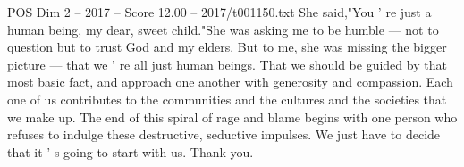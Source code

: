 \begin{textsample}{POS Dim 2 – 2017 – Score 12.00 – 2017/t001150.txt}
She said,"You ' re just a human being, my dear, sweet child."She was asking me to be humble — not to question but to trust God and my elders.
But to me, she was missing the bigger picture — that we ' re all just human beings.
That we should be guided by that most basic fact, and approach one another with generosity and compassion.
Each one of us contributes to the communities and the cultures and the societies that we make up.
The end of this spiral of rage and blame begins with one person who refuses to indulge these destructive, seductive impulses.
We just have to decide that it ' s going to start with us.
Thank you.

\end{textsample}

